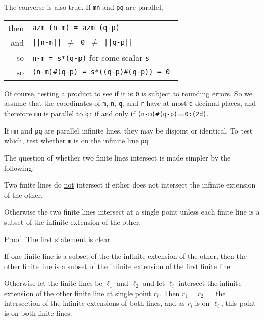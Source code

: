 \documentclass[12pt]{article}
\begin{document}
The converse is also true.  If {\tt mn} and {\tt pq} are parallel, \\
\hspace*{0.3in}\begin{tabular}{r@{~~}l}
then    & {\tt azm (n-m) = azm (q-p)} \\
and     & \tt ||n-m|| $\neq$ 0 $\neq$ ||q-p|| \\
so      & {\tt n-m = s*(q-p)} for some scalar {\tt s} \\
so      & \tt (n-m)\#(q-p) = s*((q-p)\#(q-p)) = 0 \\
        \end{tabular}

Of course, testing a product to see if it is {\tt 0} is subject to
rounding errors.  So we assume that the coordinates of {\tt m},
{\tt n}, {\tt q}, and {\tt r} have at most {\tt d} decimal places,
and therefore {\tt mn} is parallel to {\tt qr} if and only if
{\tt (n-m)\#(q-p)==0:(2d)}.

If {\tt mn} and {\tt pq} are parallel infinite lines, they
may be disjoint or identical.  To test which, test whether
{\tt m} is on the infinite line {\tt pq} 

The question of whether two finite lines intersect is made
simpler by the following:
\begin{lemma}
Two finite lines do \underline{not} intersect
if either does not intersect the infinite extension of the other.

Otherwise the two finite lines intersect at a single point unless
each finite line is a subset of the infinite extension of the other.
\end{lemma}
\begin{indpar}{0.3in}
Proof: The first statement is clear.

If one finite line is a subset of the the infinite extension of the
other, then the other finite line is a subset of the infinite extension
of the first finite line.

Otherwise let the finite lines be $\ell_1$ and $\ell_2$ and let
$\ell_i$ intersect the infinite extension of the other finite line
at single point $r_i$.  Then $r_1=r_2=$ the intersection of the infinite
extensions of both lines, and as $r_i$ is on $\ell_i$, this point is
on both finite lines.
\end{indpar}
\end{document}
